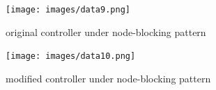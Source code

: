 \begin{figure}[!htb]
 \centering
 \texttt{[image: images/data9.png]}\\
 \caption{original controller under node-blocking pattern}
 \label{fig:original_database}
\end{figure}

\begin{figure}[!htb]
 \centering
 \texttt{[image: images/data10.png]}\\
 \caption{modified controller under node-blocking pattern}
 \label{fig:modified_database}
\end{figure}
